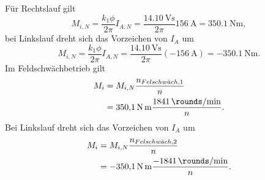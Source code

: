 \documentclass[11pt,a4paper]{scrartcl}
\newcommand{\mybr}[1]{\left(#1\right)}
\newcommand{\0}{_{\mybr{0}}}
\newcommand{\1}{_{\mybr{1}}}
\newcommand{\2}{_{\mybr{2}}}
\begin{document}
\subsection{}
Für Rechtslauf gilt
\begin{equation}
M_{i,N}=\frac{k_1\phi}{2\pi}I_{A,N}=\frac{\SI{14.10}{\volt\second}}{2\pi}\SI{156}{\ampere}=\SI{350.1}{\newton\metre},
\end{equation}
bei Linkslauf dreht sich das Vorzeichen von $I_A$ um
\begin{equation}
M_{i,N}=\frac{k_1\phi}{2\pi}I_{A,N}=\frac{\SI{14.10}{\volt\second}}{2\pi}\mybr{\SI{-156}{\ampere}}=\SI{-350.1}{\newton\metre}.
\end{equation}
Im Feldschwächbetrieb gilt
\begin{align}
M_i&=M_{i,N}\frac{n_{Felschw\ddot{a}ch,1}}{n}\\
&=\SI{350.1}{\newton\metre}\frac{\SI{1841}{\rounds\per\minute}}{n}.
\end{align}
Bei Linkslauf dreht sich das Vorzeichen von $I_A$ um
\begin{align}
M_i&=M_{i,N}\frac{n_{Felschw\ddot{a}ch,2}}{n}\\
&=\SI{-350.1}{\newton\metre}\frac{\SI{-1841}{\rounds\per\minute}}{n}.
\end{align}
\begin{figure*}[!ht]
\centering
{}
\end{figure*}
\end{document}
